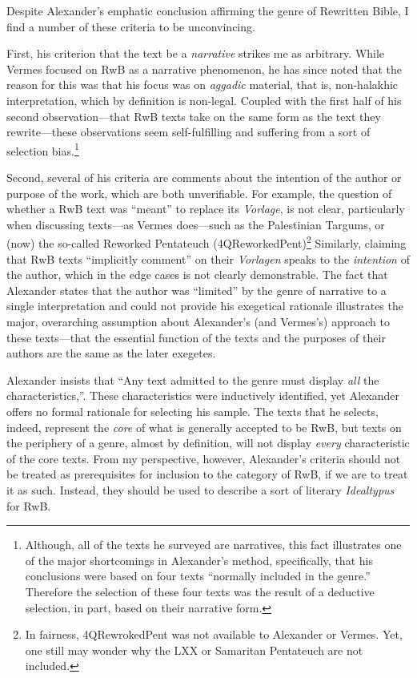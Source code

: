 Despite Alexander's emphatic conclusion affirming the genre of
Rewritten Bible, I find a number of these criteria to be unconvincing.

First, his criterion that the text be a \emph{narrative} strikes me as
arbitrary. While Vermes focused on RwB as a narrative phenomenon, he has
since noted that the reason for this was that his focus was on
\emph{aggadic} material, that is, non-halakhic interpretation, which by
definition is non-legal. Coupled with the first half of his second
observation---that RwB texts take on the same form as the text they
rewrite---these observations seem self-fulfilling and suffering from a
sort of selection bias.\footnote{Although, all of the texts he surveyed
  are narratives, this fact illustrates one of the major shortcomings in
  Alexander's method, specifically, that his conclusions were based on
  four texts ``normally included in the
  genre.''\autocite[99]{alexander_carson-williamson1988} Therefore the
  selection of these four texts was the result of a deductive selection,
  in part, based on their narrative form.}

Second, several of his criteria are comments about the intention of the
author or purpose of the work, which are both unverifiable. For example,
the question of whether a RwB text was ``meant'' to replace its
\emph{Vorlage}, is not clear, particularly when discussing texts---as
Vermes does---such as the Palestinian Targums, or (now) the so-called
Reworked Pentateuch (4QReworkedPent)\footnote{In fairness,
  4QRewrokedPent was not available to Alexander or Vermes. Yet, one
  still may wonder why the LXX or Samaritan Pentateuch are not included.}
Similarly, claiming that RwB texts ``implicitly comment'' on their
\emph{Vorlagen} speaks to the \emph{intention} of the author, which in
the edge cases is not clearly demonstrable. The fact that Alexander
states that the author was ``limited'' by the genre of narrative to a
single interpretation and could not provide his exegetical rationale
illustrates the major, overarching assumption about Alexander's (and
Vermes's) approach to these texts---that the essential function of the
texts and the purposes of their authors are the same as the later
exegetes.

Alexander insists that ``Any text admitted to the genre must display
\emph{all} the characteristics,''\autocite[119 n.
11]{alexander_carson-williamson1988}. These characteristics were
inductively identified, yet Alexander offers no formal rationale for
selecting his sample. The texts that he selects, indeed, represent the
\emph{core} of what is generally accepted to be RwB, but texts on the
periphery of a genre, almost by definition, will not display
\emph{every} characteristic of the core texts. From my perspective,
however, Alexander's criteria should not be treated as prerequisites for
inclusion to the category of RwB, if we are to treat it as such.
Instead, they should be used to describe a sort of literary
\emph{Idealtypus} for RwB.

